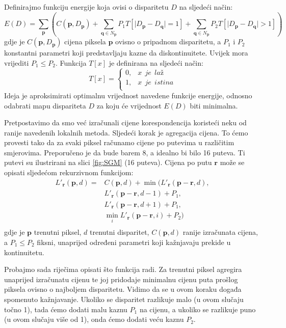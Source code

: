 \documentclass[utf8, zavrsni, numeric]{fer}
\begin{document}
Definirajmo funkciju energije koja ovisi o disparitetu $D$ na sljedeći način:
\begin{equation} \label{energija}
E(D) = \sum_{\mathbf{p}}(C(\mathbf{p}, D_{\mathbf{p}}) + \sum_{\mathbf{q} \in N_{\mathbf{p}}} P_1 T [\lvert D_{\mathbf{p}} - D_{\mathbf{q}}\rvert = 1] + \sum_{\mathbf{q} \in N_{\mathbf{p}}} P_2 T [\lvert D_{\mathbf{p}} - D_{\mathbf{q}}\rvert > 1])
\end{equation}
gdje je $C(\mathbf{p}, D_{\mathbf{p}})$ cijena piksela $\mathbf{p}$ ovisno o pripadnom disparitetu, a $P_1$ i $P_2$ konstantni parametri koji predstavljaju kazne da diskontinuitete. Uvijek mora vrijediti $P_1 \leq P_2$.
Funkcija $T[x]$ je definirana na sljedeći način:
\[   
T[x] = 
     \begin{cases}
       0, & x\ \ je\ \ laž \\
       1, & x\ \ je\ \ istina \\
     \end{cases}
\]
Ideja je aproksimirati optimalnu vrijednost navedene funkcije energije, odnosno odabrati
mapu dispariteta $D$ za koju će vrijednost $E(D)$ biti minimalna.

Pretpostavimo da smo već izračunali cijene korespondencija koristeći neku od ranije navedenih lokalnih metoda.
Sljedeći korak je agregacija cijena. To ćemo provesti tako da za svaki piksel računamo cijene
po putevima u različitim smjerovima. Preporučeno je da bude barem 8, a idealno bi bilo 16 puteva. Ti putevi su ilustrirani na slici \ref{fig:SGM} (16 puteva). Cijena po putu $\mathbf{r}$
može se opisati sljedećom rekurzivnom funkcijom:
\begin{equation} \label{cijena_1}
  \begin{split}
    L'_{\mathbf{r}}(\mathbf{p}, d) = & C(\mathbf{p}, d) + \min(L'_{\mathbf{r}}(\mathbf{p} - \mathbf{r}, d), \\
    & L'_{\mathbf{r}}(\mathbf{p} - \mathbf{r}, d - 1) + P_1, \\
    & L'_{\mathbf{r}}(\mathbf{p} - \mathbf{r}, d + 1) + P_1, \\
    & \min\limits_{i} L'_{\mathbf{r}}(\mathbf{p} - \mathbf{r}, i) + P_2) \\
  \end{split}
\end{equation}
gdje je $\mathbf{p}$ trenutni piksel, $d$ trenutni disparitet, $C(\mathbf{p}, d)$ ranije
izračunata cijena, a $P_1 \leq P_2$ fiksni, unaprijed određeni parametri koji kažnjavaju
prekide u kontinuitetu.

Probajmo sada riječima opisati što funkcija radi. Za trenutni piksel agregira unaprijed izračunatu cijenu te joj pridodaje minimalnu cijenu puta prošlog piksela ovisno o najboljem disparitetu. Vidimo da se u ovom koraku događa spomenuto kažnjavanje.
Ukoliko se disparitet razlikuje malo (u ovom slučaju točno 1), tada ćemo dodati malu kaznu $P_1$ na cijenu, a ukoliko
se razlikuje puno (u ovom slučaju više od 1), onda ćemo dodati veću kaznu $P_2$.
\end{document}
